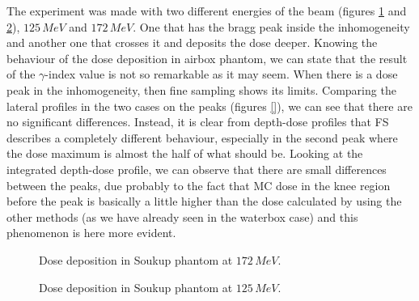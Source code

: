 \documentclass[12pt, a4paper, twoside]{book}
\begin{document}
The experiment was made with two different energies of the beam (figures \ref{fig:SB1} and \ref{fig:SB2}), $125\,MeV$ and $172\,MeV$. One that has the bragg peak inside the inhomogeneity and another one that crosses it and deposits the dose deeper.
Knowing the behaviour of the dose deposition in airbox phantom, we can state that the result of the $\gamma$-index value is not so remarkable as it may seem. When there is a dose peak in the inhomogeneity, then fine sampling shows its limits.
Comparing the lateral profiles in the two cases on the peaks (figures \ref{}), we can see that there are no significant differences. Instead, it is clear from depth-dose profiles that FS describes a completely different behaviour, especially in the second peak where the dose maximum is almost the half of what should be. Looking at the integrated depth-dose profile, we can observe that there are small differences between the peaks, due probably to the fact that MC dose in the knee region before the peak is basically a little higher than the dose calculated by using the other methods (as we have already seen in the waterbox case) and this phenomenon is here more evident.
\begin{figure}[!t]
\centering
{}\quad
{}\quad
{}\quad
\caption{Dose deposition in Soukup phantom at $172\,MeV$.}
\label{fig:SB1}
\end{figure}
\begin{figure}[!t]
\centering
{}\quad
{}\quad
{}\quad
\caption{Dose deposition in Soukup phantom at $125\,MeV$.}
\label{fig:SB2}
\end{figure}
\end{document}
